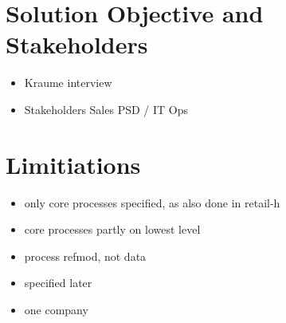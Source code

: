 \section{Solution Objective and Stakeholders}
\begin{itemize}
	\item Kraume interview
	\item Stakeholders
	\subitem Sales
	\subitem PSD / IT
	\subitem Ops
\end{itemize}
\section{Limitiations}
\begin{itemize}
	\item only core processes specified, as also done in retail-h
	\item core processes partly on lowest level
	\item process refmod, not data
	\item specified later
		\item one company
\end{itemize}

